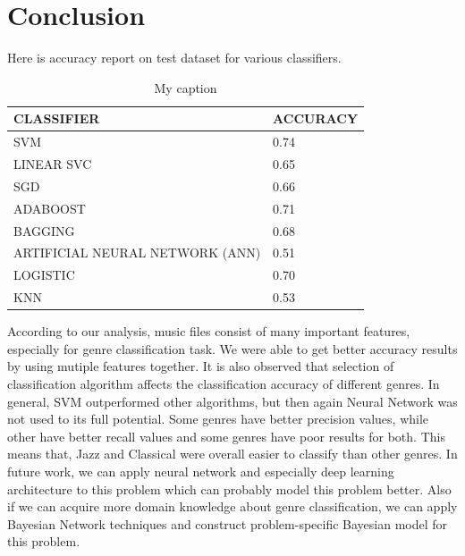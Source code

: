 \documentclass[conference]{IEEEtran}
\begin{document}
\section{Conclusion}
Here is accuracy report on test dataset for various classifiers.
\begin{table}[H]
\centering
\caption{My caption}
\label{my-label}
\begin{tabular}{ll}
\hline
\textbf{CLASSIFIER}                  & \textbf{ACCURACY}         \\ \hline
\multicolumn{1}{|l|}{SVM}            & \multicolumn{1}{l|}{0.74} \\ \hline
\multicolumn{1}{|l|}{LINEAR SVC}     & \multicolumn{1}{l|}{0.65} \\ \hline
\multicolumn{1}{|l|}{SGD}            & \multicolumn{1}{l|}{0.66} \\ \hline
\multicolumn{1}{|l|}{ADABOOST}       & \multicolumn{1}{l|}{0.71} \\ \hline
\multicolumn{1}{|l|}{BAGGING}        & \multicolumn{1}{l|}{0.68} \\ \hline
\multicolumn{1}{|l|}{ARTIFICIAL NEURAL NETWORK (ANN) } & \multicolumn{1}{l|}{0.51} \\ \hline
\multicolumn{1}{|l|}{LOGISTIC}        & \multicolumn{1}{l|}{0.70} \\ \hline
\multicolumn{1}{|l|}{KNN}            & \multicolumn{1}{l|}{0.53} \\ \hline
\end{tabular}
\end{table}

According to our analysis, music files consist of many important features, especially for genre classification task. We were able to get better accuracy results by using mutiple features together. It is also observed that selection of classification algorithm affects the classification accuracy of different genres. In general, SVM outperformed other algorithms, but then again Neural Network was not used to its full potential. Some genres have better precision values, while other have better recall values and some genres have poor results for both. This means that, Jazz and Classical were overall easier to classify than other genres. In future work, we can apply neural network and especially deep learning architecture to this problem which can probably model this problem better. Also if we can acquire more domain knowledge about genre classification, we can apply Bayesian Network techniques and construct problem-specific Bayesian model for this problem.
\end{document}
